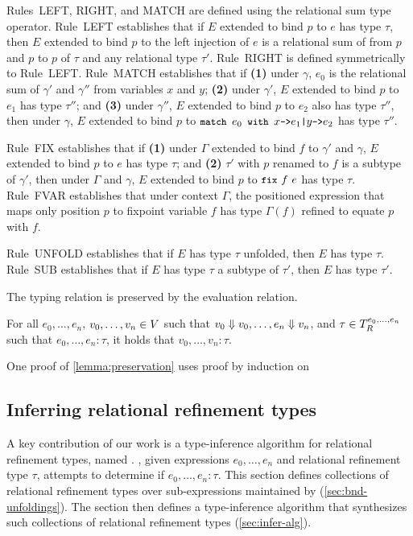 Rules~LEFT, RIGHT, and MATCH are defined using the relational sum type
operator.
Rule~LEFT establishes that if $E$ extended to bind $p$ to $e$ has type
$\tau$, then $E$ extended to bind $p$ to the left injection of $e$ is
a relational sum of from $p$ and $p$ to $p$ of $\tau$ and any
relational type $\tau'$.
%
Rule~RIGHT is defined symmetrically to Rule~LEFT.
Rule~MATCH establishes that if %
\textbf{(1)} under $\gamma$, $e_0$ is the relational sum of $\gamma'$
and $\gamma''$ from variables $x$ and $y$;
% 
\textbf{(2)} under $\gamma'$, $E$ extended to bind $p$ to $e_1$ has
type $\tau''$; and
%
\textbf{(3)} under $\gamma''$, $E$ extended to bind $p$ to $e_2$ also
has type $\tau''$, then under $\gamma$, $E$ extended to bind $p$ to
$\matchexp{e_0}{x}{e_1}{y}{e_2}$ has type $\tau''$.

Rule~FIX establishes that if %
\textbf{(1)} under $\Gamma$ extended to bind $f$ to $\gamma'$ and
$\gamma$, $E$ extended to bind $p$ to $e$ has type $\tau$; and %
\textbf{(2)} $\tau'$ with $p$ renamed to $f$ is a subtype of
$\gamma'$, then under $\Gamma$ and $\gamma$, $E$ extended to bind $p$
to $\fix{f}{e}$ has type $\tau$.
Rule~FVAR establishes that under context $\Gamma$, the positioned
expression that maps only position $p$ to fixpoint variable $f$ has
type $\Gamma(f)$ refined to equate $p$ with $f$.

Rule~UNFOLD establishes that if $E$ has type $\tau$ unfolded,
then $E$ has type $\tau$.
Rule~SUB establishes that if $E$ has type $\tau$ a subtype of $\tau'$,
then $E$ has type $\tau'$.

The typing relation is preserved by the evaluation relation.
%
\begin{lemma}
  \label{lemma:preservation}
  For all $e_0, \ldots, e_n$, $v_0, \ldots, v_n \in V$ such that
  $v_0 \Downarrow v_0, \ldots, e_n \Downarrow v_n$, and
  $\tau \in T_{R}^{e_0, \ldots, e_n}$ such that
  $e_0, \ldots, e_n : \tau$, it holds that $v_0, \ldots, v_n : \tau$.
\end{lemma}
%
One proof of \autoref{lemma:preservation} uses proof by induction on
%

\subsection{Inferring relational refinement types}
\label{sec:infer}
%
A key contribution of our work is a type-inference algorithm for
relational refinement types, named \sys.
%
\sys, given expressions $e_0, \ldots, e_n$ and relational refinement
type $\tau$, attempts to determine if $e_0, \ldots, e_n : \tau$.
%
This section defines collections of relational refinement types over
sub-expressions maintained by \sys (\autoref{sec:bnd-unfoldings}).
%
The section then defines a type-inference algorithm that synthesizes
such collections of relational refinement types
(\autoref{sec:infer-alg}).

